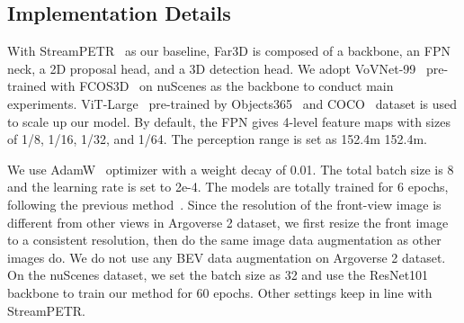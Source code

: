 \documentclass[letterpaper]{article} \usepackage{aaai24}
\begin{document}
\begin{table}[t]
    
    \centering
    \caption{Ablation of our components on Argoverse 2 \texttt{val} set. StreamPETR is employed as the baseline, and we add the adaptive query, perspective-aware aggregation (PA) and range-modulated 3D denoising in order.}
    \vspace{-0.2cm}
    \label{tab:ablate_component}
    \tiny
    \vspace{-0.3cm}
\end{table} \subsection{Implementation Details}
With StreamPETR~\cite{wang2023exploring} as our baseline,
Far3D is composed of a backbone, an FPN neck, a 2D proposal head, and a 3D detection head. We adopt VoVNet-99~\cite{lee2019energy} pre-trained with FCOS3D~\cite{wang2021fcos3d} on nuScenes as the backbone to conduct main experiments. ViT-Large~\cite{dosovitskiy2020image} pre-trained by Objects365~\cite{shao2019objects365} and COCO~\cite{lin2014microsoft} dataset is used to scale up our model. By default, the FPN gives 4-level feature maps with sizes of 1/8, 1/16, 1/32, and 1/64. The perception range is set as 152.4m  152.4m.

We use AdamW~\cite{loshchilov2017decoupled} optimizer with a weight decay of 0.01. The total batch size is 8 and the learning rate is set to 2e-4. 
The models are totally trained for 6 epochs, following the previous method~\cite{chen2023voxelnext}. Since the resolution of the front-view image is different from other views in Argoverse 2 dataset, we first resize the front image to a consistent resolution, then do the same image data augmentation as other images do. We do not use any BEV data augmentation on Argoverse 2 dataset. On the nuScenes dataset, we set the batch size as 32 and use the ResNet101~\cite{he2016resnet} backbone to train our method for 60 epochs. Other settings keep in line with StreamPETR.
\end{document}

